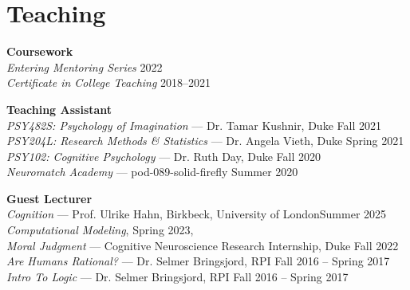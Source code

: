 \section{Teaching}
\textbf{Coursework} \\
\emph{Entering Mentoring Series} \hfill 2022 \\
\emph{Certificate in College Teaching} \hfill 2018--2021

\textbf{Teaching Assistant} \\
\emph{PSY482S: Psychology of Imagination} --- Dr. Tamar Kushnir, Duke \hfill Fall 2021 \\
\emph{PSY204L: Research Methods \& Statistics} --- Dr. Angela Vieth, Duke \hfill Spring 2021 \\
\emph{PSY102: Cognitive Psychology} --- Dr. Ruth Day, Duke  \hfill Fall 2020 \\
\emph{Neuromatch Academy} --- pod-089-solid-firefly \hfill Summer 2020

\textbf{Guest Lecturer} \\
\emph{Cognition} ---  Prof. Ulrike Hahn, Birkbeck, University of London\hfill Summer 2025 \\
\emph{Computational Modeling},  \hfill Spring 2023, \\
\emph{Moral Judgment} --- Cognitive Neuroscience Research Internship, Duke \hfill Fall 2022 \\
\emph{Are Humans Rational?} --- Dr. Selmer Bringsjord, RPI \hfill Fall 2016 -- Spring 2017 \\
\emph{Intro To Logic} --- Dr. Selmer Bringsjord, RPI \hfill Fall 2016 -- Spring 2017
